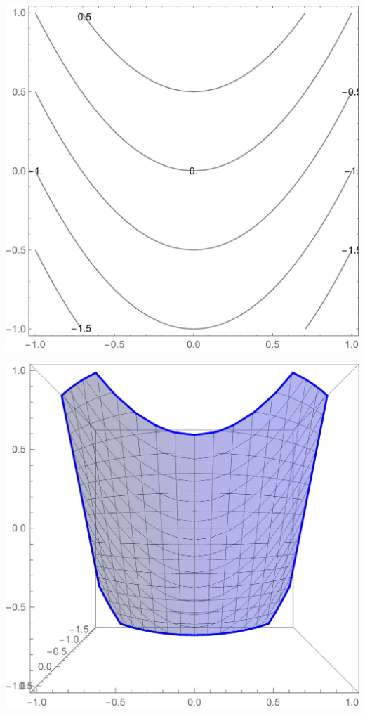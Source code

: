 \documentclass[a4paper, 12pt]{article}
\begin{document}
	\begin{minipage}{.5\linewidth}
		\includegraphics[scale=.24]{images/ContourLabels}
	\end{minipage}
	\begin{minipage}{.5\linewidth}
		\includegraphics[scale=.25]{images/Top3dContours}
	\end{minipage}
\end{document}
